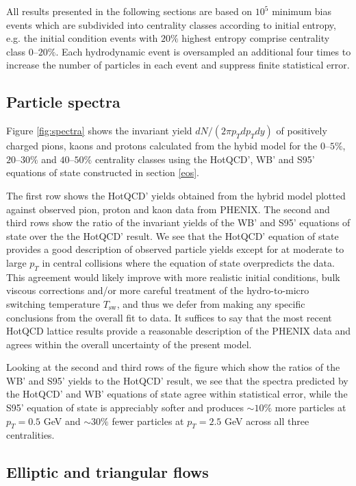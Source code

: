 \documentclass[aps,prc,reprint,amsmath,nofootinbib,superscriptaddress]{revtex4-1}
\begin{document}
All results presented in the following sections are based on $10^5$ minimum bias events which are subdivided into centrality classes according to initial entropy, e.g. the initial condition events 
with $20\%$ highest entropy comprise centrality class $0$--$20\%$. Each hydrodynamic event is oversampled an additional four times to increase the number of particles in each event and suppress 
finite statistical error.

\subsection{Particle spectra}
\label{spectra}

Figure \ref{fig:spectra} shows the invariant yield $dN/(2\pi p_T dp_T dy)$ of positively charged pions, kaons and protons calculated from the hybid model for the $0$--$5\%$, $20$--$30\%$
and $40$--$50\%$ centrality classes using the HotQCD', WB' and S95' equations of state constructed in section \ref{eos}. 

The first row shows the HotQCD' yields obtained from the hybrid model plotted against observed pion, proton and kaon data from PHENIX. The second and third rows show the ratio of the invariant yields of 
the WB' and S95' equations of state over the the HotQCD' result. We see that the HotQCD' equation of state provides a good description of observed particle yields except for at moderate 
to large $p_T$ in central collisions where the equation of state overpredicts the data. This agreement would likely improve with more realistic initial conditions, bulk viscous corrections 
and/or more careful treatment of the hydro-to-micro switching temperature $T_\text{sw}$, and thus we defer from making any specific conclusions from the overall fit to data. It suffices to say that the 
most recent HotQCD lattice results provide a reasonable description of the PHENIX data and agrees within the overall uncertainty of the present model. 

Looking at the second and third rows of the figure which show the ratios of the WB' and S95' yields to the HotQCD' result, we see that the spectra predicted by the HotQCD' and WB' equations of state 
agree within statistical error, while the S95' equation of state is appreciably softer and produces $\sim 10\%$ more particles at $p_T = 0.5$ GeV and $\sim 30\%$ fewer particles at $p_T=2.5$ GeV across all three centralities.

\subsection{Elliptic and triangular flows}
\label{flow}
\end{document}
